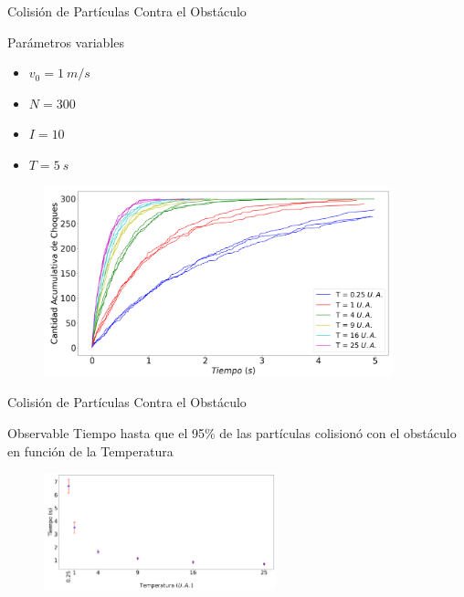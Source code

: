 \begin{frame}{Colisión de Partículas Contra el Obstáculo}
    \begin{minipage}{0.25\textwidth}
        \begin{block}{Parámetros variables}
            \begin{itemize}
                \item $v_0 = 1\ m/s$
                \item $N = 300$
                \item $I = 10$
                \item $T = 5\ s$
            \end{itemize}
        \end{block}
    \end{minipage}
    \hfill
    \begin{minipage}{0.7\textwidth} %
        \begin{figure}[H]
            \centering
            \includegraphics[width=0.9\textwidth]{pic/ejer3/a3Tiradas}
            \label{fig:ejer3:atiradas}
        \end{figure}
    \end{minipage}
\end{frame}

\begin{frame}{Colisión de Partículas Contra el Obstáculo}
    \begin{block}{Observable}
        Tiempo hasta que el 95\% de las partículas colisionó con el obstáculo en función de la Temperatura
    \end{block}

    \begin{figure}[H]
        \centering
        \includegraphics[width=0.6\textwidth]{pic/ejer3/aObs}
        \label{fig:ejer3:aobservable}
    \end{figure}

\end{frame}



